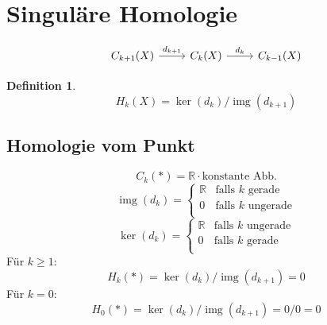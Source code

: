 \documentclass{article}
\title{\titlevar}
\author{\authorvar}
\date{\datevar}
\DeclareMathOperator{\img}{img}
\newtheorem{definition}{Definition}
\begin{document}
	\maketitle

	\tableofcontents
	
	\section{Singuläre Homologie}

	\[\begin{tikzcd}
		{C_{k+1}(X)} & {C_k(X)} & {C_{k-1}(X)}
		\arrow["{d_{k+1}}", from=1-1, to=1-2]
		\arrow["{d_k}", from=1-2, to=1-3]
	\end{tikzcd}\]
	
	\begin{definition}
		\begin{equation*}
			H_k(X) = \ker(d_k) / \img(d_{k+1})
		\end{equation*}
	\end{definition}
	
	\subsection{Homologie vom Punkt}
	
	\begin{equation*}
		C_k(*) = ℝ · \text{konstante Abb.}
	\end{equation*}
	\begin{equation*}
		\img(d_k) = \begin{cases}
			ℝ & \text{falls $k$ gerade}\\
			0 & \text{falls $k$ ungerade}\\
		\end{cases}	
	\end{equation*}
	\begin{equation*}
		\ker(d_k) = \begin{cases}
			ℝ & \text{falls $k$ ungerade}\\
			0 & \text{falls $k$ gerade}\\
		\end{cases}
	\end{equation*}
	Für $k≥1$:
	\begin{equation*}
		H_k(*) = \ker(d_k) / \img(d_{k+1}) = 0
	\end{equation*}
	Für $k=0$:
	\begin{equation*}
		H_0(*) = \ker(d_k) / \img(d_{k+1}) = 0/0 = 0
	\end{equation*}
	
\end{document}
